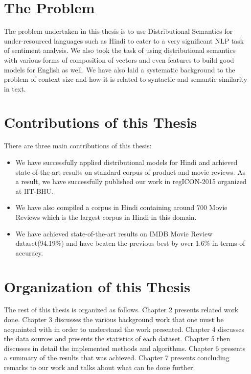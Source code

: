 \section{The Problem}
The problem undertaken in this thesis is to use Distributional Semantics for under-resourced languages such as Hindi to cater to a very significant NLP task of sentiment analysis. We also took the task of using distributional semantics with various forms of composition of vectors and even features to build good models for English as well. We have also laid a systematic background to the problem of context size and how it is related to syntactic and semantic similarity in text. 

\section{Contributions of this Thesis}
There are three main contributions of this thesis:
\begin{itemize}
\item We have successfully applied distributional models for Hindi and achieved state-of-the-art results on standard corpus of product and movie reviews. As a result, we have successfully published our work in regICON-2015 organized at IIT-BHU.
\item We have also compiled a corpus in Hindi containing around 700 Movie Reviews which is the largest corpus in Hindi in this domain.
\item We have achieved state-of-the-art results on IMDB Movie Review dataset(94.19\%) and have beaten the previous best by over 1.6\% in terms of accuracy.
\end{itemize}

\section{Organization of this Thesis}
The rest of this thesis is organized as follows. Chapter 2 presents related work done. Chapter 3 discusses the various background work that one must be acquainted with in order to understand the work presented. Chapter 4 discusses the data sources and presents the statistics of each dataset. Chapter 5 then discusses in detail the implemented methods and algorithms. Chapter 6 presents a summary of the results that was achieved. Chapter 7 presents concluding remarks to our work and talks about what can be done further.
